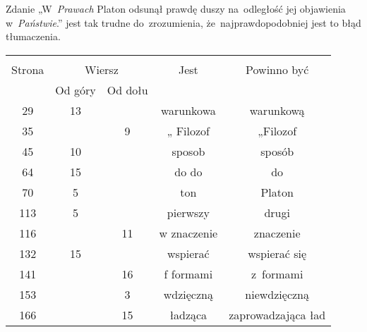 \documentclass[a4paper,11pt]{article}
\begin{document}
\vspace{\spaceFour}





\start {} Zdanie „W~\textit{Prawach} Platon odsunął prawdę
duszy na~odległość jej objawienia w~\textit{Państwie}.” jest tak trudne
do~zrozumienia, że~najprawdopodobniej jest to błąd tłumaczenia.





\newpage



\begin{center}

  \begin{tabular}{|c|c|c|c|c|}
    \hline
    & \multicolumn{2}{c|}{} & & \\
    Strona & \multicolumn{2}{c|}{Wiersz} & Jest
                              & Powinno być \\ \cline{2-3}
    & Od góry & Od dołu & & \\
    \hline
    29  & 13 & & warunkowa & warunkową \\
    35  & &  9 & „ Filozof & „Filozof \\
    45  & 10 & & sposob & sposób \\
    64  & 15 & & do do & do \\
    70  &  5 & & ton & Platon \\
    113 &  5 & & pierwszy & drugi \\
    116 & & 11 & w znaczenie & znaczenie \\
    132 & 15 & & wspierać & wspierać się \\
    141 & & 16 & f formami & z~formami \\
    153 & &  3 & wdzięczną & niewdzięczną \\
    166 & & 15 & ładząca & zaprowadzająca ład \\
    \hline
  \end{tabular}

\end{center}

\vspace{\spaceTwo}



\end{document}
